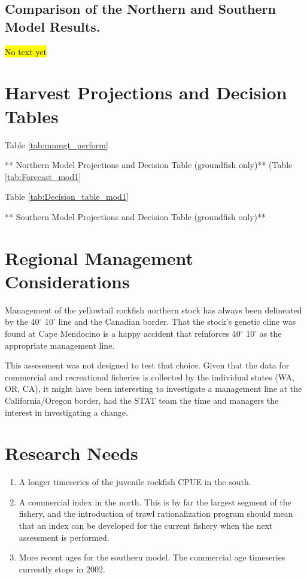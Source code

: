 \documentclass[12pt,]{article}
\begin{document}
\subsection{Comparison of the Northern and Southern Model
Results.}\label{comparison-of-the-northern-and-southern-model-results.}

\hl{No text yet}

\newpage

\section{Harvest Projections and Decision
Tables}\label{harvest-projections-and-decision-tables}

Table \ref{tab:mnmgt_perform}

** Northern Model Projections and Decision Table (groundfish only)**
(Table \ref{tab:Forecast_mod1}

Table \ref{tab:Decision_table_mod1}

** Southern Model Projections and Decision Table (groundfish only)**

\newpage

\section{Regional Management
Considerations}\label{regional-management-considerations}

Management of the yellowtail rockfish northern stock has always been
delineated by the 40\(^\circ\) 10' line and the Canadian border. That
the stock's genetic cline was found at Cape Mendocino is a happy
accident that reinforces 40\(^\circ\) 10' as the appropriate management
line.

This assessment was not designed to test that choice. Given that the
data for commercial and recreational fisheries is collected by the
individual states (WA, OR, CA), it might have been interesting to
investigate a management line at the California/Oregon border, had the
STAT team the time and managers the interest in investigating a change.

\newpage

\section{Research Needs}\label{research-needs}

\begin{enumerate}

\item A longer timeseries of the juvenile rockfish CPUE in the south.

\item A commercial index in the north.  This is by far the largest segment of the fishery, and the introduction of trawl rationalization program should mean that an index can be developed for the current fishery when the next assessment is performed.

\item More recent ages for the southern model.  The commercial age timeseries currently stops in 2002.

\end{enumerate}
\end{document}
